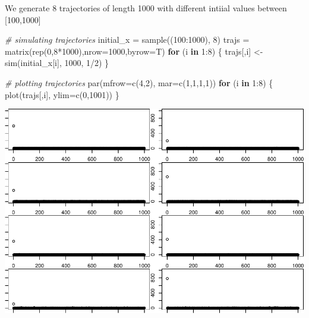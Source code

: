 \documentclass[
]{article}
\newenvironment{Shaded}{\begin{snugshade}}{\end{snugshade}}
\newcommand{\AttributeTok}[1]{\textcolor[rgb]{0.77,0.63,0.00}{#1}}
\newcommand{\CommentTok}[1]{\textcolor[rgb]{0.56,0.35,0.01}{\textit{#1}}}
\newcommand{\ControlFlowTok}[1]{\textcolor[rgb]{0.13,0.29,0.53}{\textbf{#1}}}
\newcommand{\DecValTok}[1]{\textcolor[rgb]{0.00,0.00,0.81}{#1}}
\newcommand{\FunctionTok}[1]{\textcolor[rgb]{0.00,0.00,0.00}{#1}}
\newcommand{\NormalTok}[1]{#1}
\newcommand{\OtherTok}[1]{\textcolor[rgb]{0.56,0.35,0.01}{#1}}
\newcommand{\SpecialCharTok}[1]{\textcolor[rgb]{0.00,0.00,0.00}{#1}}
\begin{document}
We generate 8 trajectories of length 1000 with different intiial values
between {[}100,1000{]}

\begin{Shaded}
\begin{Highlighting}[]
\CommentTok{\# simulating trajectories}
\NormalTok{initial\_x }\OtherTok{=} \FunctionTok{sample}\NormalTok{((}\DecValTok{100}\SpecialCharTok{:}\DecValTok{1000}\NormalTok{), }\DecValTok{8}\NormalTok{)}
\NormalTok{trajs }\OtherTok{=} \FunctionTok{matrix}\NormalTok{(}\FunctionTok{rep}\NormalTok{(}\DecValTok{0}\NormalTok{,}\DecValTok{8}\SpecialCharTok{*}\DecValTok{1000}\NormalTok{),}\AttributeTok{nrow=}\DecValTok{1000}\NormalTok{,}\AttributeTok{byrow=}\NormalTok{T)}
\ControlFlowTok{for}\NormalTok{ (i }\ControlFlowTok{in} \DecValTok{1}\SpecialCharTok{:}\DecValTok{8}\NormalTok{) \{}
\NormalTok{    trajs[,i] }\OtherTok{\textless{}{-}} \FunctionTok{sim}\NormalTok{(initial\_x[i], }\DecValTok{1000}\NormalTok{, }\DecValTok{1}\SpecialCharTok{/}\DecValTok{2}\NormalTok{)}
\NormalTok{\}}
\end{Highlighting}
\end{Shaded}

\begin{Shaded}
\begin{Highlighting}[]
\CommentTok{\# plotting trajectories}
\FunctionTok{par}\NormalTok{(}\AttributeTok{mfrow=}\FunctionTok{c}\NormalTok{(}\DecValTok{4}\NormalTok{,}\DecValTok{2}\NormalTok{), }\AttributeTok{mar=}\FunctionTok{c}\NormalTok{(}\DecValTok{1}\NormalTok{,}\DecValTok{1}\NormalTok{,}\DecValTok{1}\NormalTok{,}\DecValTok{1}\NormalTok{))}
\ControlFlowTok{for}\NormalTok{ (i }\ControlFlowTok{in} \DecValTok{1}\SpecialCharTok{:}\DecValTok{8}\NormalTok{) \{}
    \FunctionTok{plot}\NormalTok{(trajs[,i], }\AttributeTok{ylim=}\FunctionTok{c}\NormalTok{(}\DecValTok{0}\NormalTok{,}\DecValTok{1001}\NormalTok{))}
\NormalTok{\}}
\end{Highlighting}
\end{Shaded}

\includegraphics{./figures/unnamed-chunk-15-1.pdf}
\end{document}
